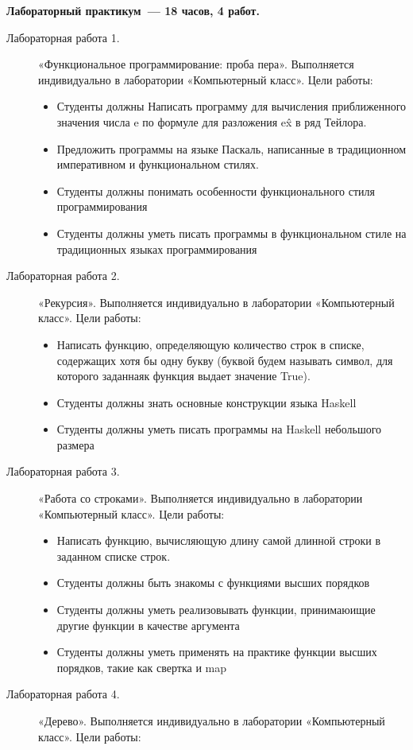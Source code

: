 {\textbf{Лабораторный практикум~— 18 часов, 4 работ.}
\begin{description}
\item[Лабораторная работа 1.] «Функциональное программирование: проба пера». Выполняется индивидуально в лаборатории «Компьютерный класс». Цели работы: \begin{itemize}
\item Студенты должны Написать программу для вычисления приближенного значения числа e по формуле для разложения e\^x в ряд Тейлора.\item Предложить программы на языке Паскаль, написанные в традиционном императивном и функциональном стилях.\item Студенты должны понимать особенности функционального стиля программирования\item Студенты должны уметь писать программы в функциональном стиле на традиционных языках программирования
\end{itemize}\item[Лабораторная работа 2.] «Рекурсия». Выполняется индивидуально в лаборатории «Компьютерный класс». Цели работы: \begin{itemize}
\item Написать функцию, определяющую количество строк в списке, содержащих хотя бы одну букву (буквой будем называть символ, для которого заданнаяк функция выдает значение True).\item Студенты должны знать основные конструкции языка Haskell\item Студенты должны уметь писать программы на Haskell небольшого размера
\end{itemize}\item[Лабораторная работа 3.] «Работа со строками». Выполняется индивидуально в лаборатории «Компьютерный класс». Цели работы: \begin{itemize}
\item Написать функцию, вычисляющую длину самой длинной строки в заданном списке строк.\item Студенты должны быть знакомы с функциями высших порядков\item Студенты должны уметь реализовывать функции, принимаюищие другие функции в качестве аргумента\item Студенты должны уметь применять на практике функции высших порядков, такие как свертка и map
\end{itemize}\item[Лабораторная работа 4.] «Дерево». Выполняется индивидуально в лаборатории «Компьютерный класс». Цели работы: \begin{itemize}

\end{itemize}
\end{description}}
